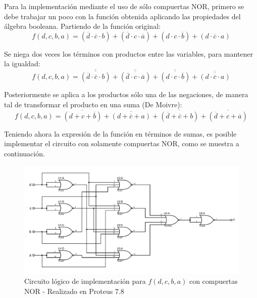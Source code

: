 Para la implementación mediante el uso de sólo compuertas NOR, primero
se debe trabajar un poco con la función obtenida aplicando las propiedades
del álgebra booleana. Partiendo de la función original:
\[
    f(d,c,b,a)=(\overline{d} \cdot \overline{c} \cdot b)+
    (\overline{d} \cdot c \cdot \overline{a})+
    (d \cdot c \cdot \overline{b})+
    (d \cdot \overline{c} \cdot a)
\]
\par
Se niega dos veces los términos con productos entre las variables,
para mantener la igualdad:
\[
    f(d,c,b,a)=\overline{\overline{(\overline{d} \cdot \overline{c} \cdot b)}}+
    \overline{\overline{(\overline{d} \cdot c \cdot \overline{a})}}+
    \overline{\overline{(d \cdot c \cdot \overline{b})}}+
    \overline{\overline{(d \cdot \overline{c} \cdot a)  }}
\]
\par
Posteriormente se aplica a los productos sólo una de las negaciones, de
manera tal de transformar el producto en una suma (De Moivre):
\[
    \boxed{f(d,c,b,a)=\overline{(d+c+\overline{b})}+
    \overline{(d+\overline{c}+a)}+
    \overline{(\overline{d}+\overline{c}+b)}+
    \overline{(\overline{d}+c+\overline{a})}}
\]
\par

Teniendo ahora la expresión de la función en términos de sumas, es posible
implementar el circuito con solamente compuertas NOR, como se muestra
a continuación.

\begin{figure}[H]
    \begin{centering}
    \includegraphics[width=1\textwidth]{ImplementacionEj2_NOR}
    \par\end{centering}
    \caption{Circuito lógico de implementación para $f(d,c,b,a)$
    con compuertas NOR - Realizado en Proteus 7.8}
\end{figure}


